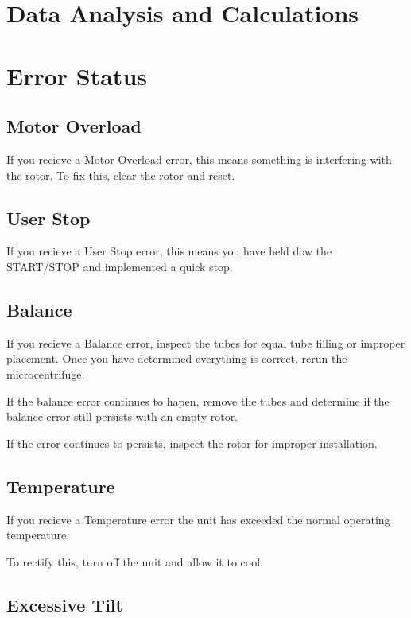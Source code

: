 \documentclass[12pt]{../SOP3_beta}
\begin{document}
\section{Data Analysis and Calculations}

\section{Error Status}

\subsection*{Motor Overload}

\NP If you recieve a Motor Overload error, this means something is interfering with the rotor. To fix this, clear the rotor and reset. 

\subsection*{User Stop}

\NP If you recieve a User Stop error, this means you have held dow the START/STOP and implemented a quick stop.

\subsection*{Balance}

\NP If you recieve a Balance error, inspect the tubes for equal tube filling or improper placement. Once you have determined everything is correct, rerun the microcentrifuge. 

\NP If the balance error continues to hapen, remove the tubes and determine if the balance error still persists with an empty rotor.

\NP If the error continues to persists, inspect the rotor for improper installation. 

\subsection*{Temperature}

\NP If you recieve a Temperature error the unit has exceeded the normal operating temperature. 

\NP To rectify this, turn off the unit and allow it to cool. 

\subsection*{Excessive Tilt}
\end{document}
